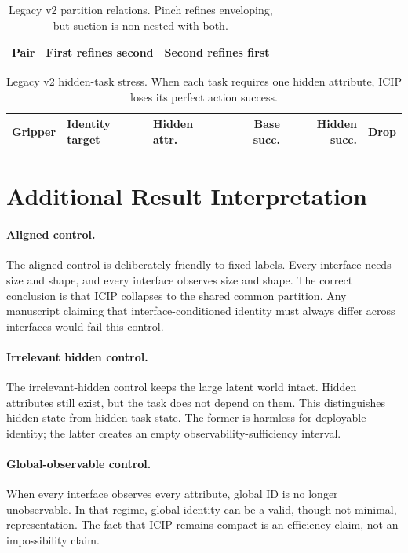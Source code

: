\documentclass{article}
\newcommand{\icip}{\textsc{ICIP}}
\begin{document}
\begin{table}[h]
\centering
\caption{Legacy v2 partition relations. Pinch refines enveloping, but suction is non-nested with both.}
\label{tab:legacy-relations}
\begin{tabular}{lcc}
\toprule
Pair & First refines second & Second refines first \\
\midrule

\end{tabular}
\end{table}

\begin{table}[h]
\centering
\caption{Legacy v2 hidden-task stress. When each task requires one hidden attribute, \icip{} loses its perfect action success.}
\label{tab:legacy-hidden}
\begin{tabular}{lllrrr}
\toprule
Gripper & Identity target & Hidden attr. & Base succ. & Hidden succ. & Drop \\
\midrule

\end{tabular}
\end{table}

\section{Additional Result Interpretation}

\paragraph{Aligned control.}
The aligned control is deliberately friendly to fixed labels.
Every interface needs size and shape, and every interface observes size and shape.
The correct conclusion is that \icip{} collapses to the shared common partition.
Any manuscript claiming that interface-conditioned identity must always differ across interfaces would fail this control.

\paragraph{Irrelevant hidden control.}
The irrelevant-hidden control keeps the large latent world intact.
Hidden attributes still exist, but the task does not depend on them.
This distinguishes hidden state from hidden task state.
The former is harmless for deployable identity; the latter creates an empty observability-sufficiency interval.

\paragraph{Global-observable control.}
When every interface observes every attribute, global ID is no longer unobservable.
In that regime, global identity can be a valid, though not minimal, representation.
The fact that \icip{} remains compact is an efficiency claim, not an impossibility claim.
\end{document}
